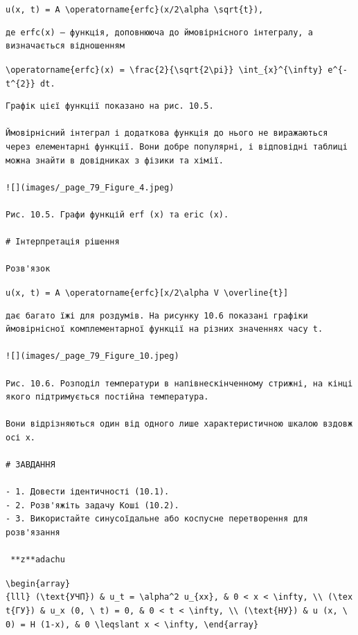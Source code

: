 \documentclass[
  ukrainian,
]{article}
\begin{document}
\texttt{u(x,\ t)\ =\ A\ \textbackslash{}operatorname\{erfc\}(x/2\textbackslash{}alpha\ \textbackslash{}sqrt\{t\}),}

\begin{verbatim}
де erfc(x) — функція, доповнююча до ймовірнісного інтегралу, а визначається відношенням
\end{verbatim}

\texttt{\textbackslash{}operatorname\{erfc\}(x)\ =\ \textbackslash{}frac\{2\}\{\textbackslash{}sqrt\{2\textbackslash{}pi\}\}\ \textbackslash{}int\_\{x\}\^{}\{\textbackslash{}infty\}\ e\^{}\{-t\^{}\{2\}\}\ dt.}

\begin{verbatim}
Графік цієї функції показано на рис. 10.5.

Ймовірнісний інтеграл і додаткова функція до нього не виражаються через елементарні функції. Вони добре популярні, і відповідні таблиці можна знайти в довідниках з фізики та хімії.

![](images/_page_79_Figure_4.jpeg)

Рис. 10.5. Графи функцій erf (x) та eric (x).

# Інтерпретація рішення

Розв'язок
\end{verbatim}

\texttt{u(x,\ t)\ =\ A\ \textbackslash{}operatorname\{erfc\}{[}x/2\textbackslash{}alpha\ V\ \textbackslash{}overline\{t\}{]}}

\begin{verbatim}
дає багато їжі для роздумів. На рисунку 10.6 показані графіки ймовірнісної комплементарної функції на різних значеннях часу t.

![](images/_page_79_Figure_10.jpeg)

Рис. 10.6. Розподіл температури в напівнескінченному стрижні, на кінці якого підтримується постійна температура.

Вони відрізняються один від одного лише характеристичною шкалою вздовж осі x.

# ЗАВДАННЯ

- 1. Довести ідентичності (10.1).
- 2. Розв'яжіть задачу Коші (10.2).
- 3. Використайте синусоїдальне або коспусне перетворення для розв'язання

 **z**adachu
\end{verbatim}

\texttt{\textbackslash{}begin\{array\}\{lll\}\ (\textbackslash{}text\{УЧП\})\ \&\ u\_t\ =\ \textbackslash{}alpha\^{}2\ u\_\{xx\},\ \&\ 0\ \textless{}\ x\ \textless{}\ \textbackslash{}infty,\ \textbackslash{}\textbackslash{}\ (\textbackslash{}text\{ГУ\})\ \&\ u\_x\ (0,\ \textbackslash{}\ t)\ =\ 0,\ \&\ 0\ \textless{}\ t\ \textless{}\ \textbackslash{}infty,\ \textbackslash{}\textbackslash{}\ (\textbackslash{}text\{НУ\})\ \&\ u\ (x,\ \textbackslash{}\ 0)\ =\ H\ (1-x),\ \&\ 0\ \textbackslash{}leqslant\ x\ \textless{}\ \textbackslash{}infty,\ \textbackslash{}end\{array\}}
\end{document}
